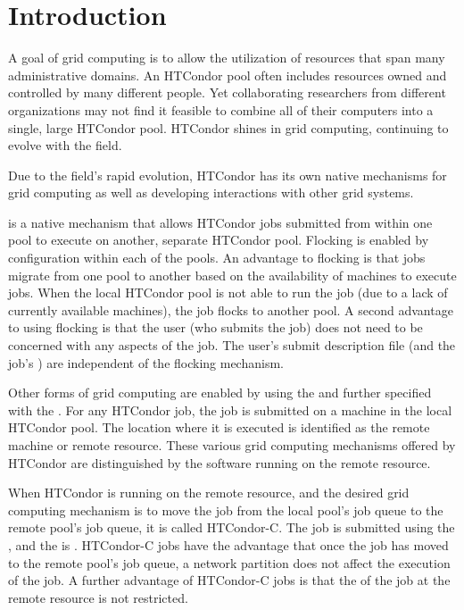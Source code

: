 \section{\label{sec:grids-intro}Introduction}

A goal of grid computing is to allow the utilization of resources that
span many administrative domains.
An HTCondor pool often includes
resources owned and controlled by many different people.
Yet collaborating researchers from different organizations
may not find it feasible to combine all of their computers
into a single, large HTCondor pool.
HTCondor shines in grid computing,
continuing to evolve with the field.

Due to the field's rapid evolution, HTCondor has its own native mechanisms
for grid computing as well as developing interactions 
with other grid systems.


 is a native mechanism that allows HTCondor jobs
submitted from within one pool
to execute on another, separate HTCondor pool.
Flocking is enabled by configuration within each of the pools.
An advantage to flocking is that jobs migrate from one
pool to another based on the availability of machines to
execute jobs.
When the local HTCondor pool is not able to run the job
(due to a lack of currently available machines),
the job flocks to another pool.
A second advantage to using flocking is that the user
(who submits the job) does not need to be concerned with
any aspects of the job.
The user's submit description file (and the job's )
are independent of the flocking mechanism.

Other forms of grid computing are enabled by using
the  
and further specified with the .
For any HTCondor job, 
the job is submitted on a machine in the local HTCondor pool.
The location where it is executed is identified as the remote machine
or remote resource.
These various grid computing mechanisms offered by
HTCondor are distinguished by the software
running on the remote resource.

When HTCondor is running on the remote resource,
and the desired grid computing mechanism 
is to move the job from the local pool's job queue
to the remote pool's job queue,
it is called HTCondor-C.
The job is submitted using the 
, 
and the  is .
HTCondor-C jobs have the advantage that once the job has moved
to the remote pool's job queue,
a network partition does not affect the execution of the job.
A further advantage of HTCondor-C jobs is that the 
of the job at the remote resource is not restricted. 

